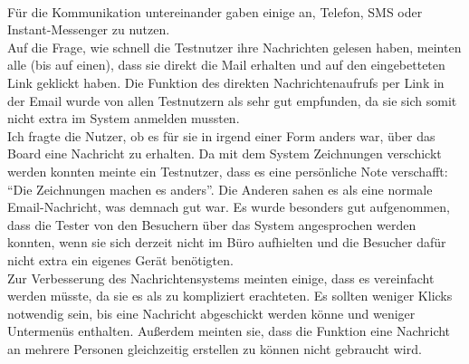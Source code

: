 \\
Für die Kommunikation untereinander gaben einige an, Telefon, SMS oder Instant-Messenger zu nutzen.
\\
Auf die Frage, wie schnell die Testnutzer ihre Nachrichten gelesen haben, meinten alle (bis auf einen), dass sie direkt die Mail erhalten und auf den eingebetteten Link geklickt haben.
Die Funktion des direkten Nachrichtenaufrufs per Link in der Email wurde von allen Testnutzern als sehr gut empfunden, da sie sich somit nicht extra im System anmelden mussten.
\\
Ich fragte die Nutzer, ob es für sie in irgend einer Form anders war, über das Board eine Nachricht zu erhalten.
Da mit dem System Zeichnungen verschickt werden konnten meinte ein Testnutzer, dass es eine persönliche Note verschafft: ``Die Zeichnungen machen es anders''.
Die Anderen sahen es als eine normale Email-Nachricht, was demnach gut war.
Es wurde besonders gut aufgenommen, dass die Tester von den Besuchern über das System angesprochen werden konnten, wenn sie sich derzeit nicht im Büro aufhielten und die Besucher dafür nicht extra ein eigenes Gerät benötigten.
\\
Zur Verbesserung des Nachrichtensystems meinten einige, dass es vereinfacht werden müsste, da sie es als zu kompliziert erachteten.
Es sollten weniger Klicks notwendig sein, bis eine Nachricht abgeschickt werden könne und weniger Untermenüs enthalten.
Außerdem meinten sie, dass die Funktion eine Nachricht an mehrere Personen gleichzeitig erstellen zu können nicht gebraucht wird.





